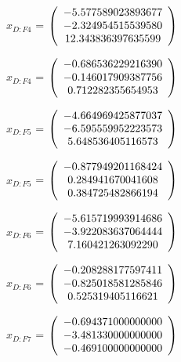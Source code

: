\begin{description}
$x_{D:F4}$  = $\left( \begin{array} {ccc} -5.577589023893677 \\ -2.324954515539580 \\ 12.343836397635599
\end{array} \right)\\ \\$

$\hat{x}_{D:F4}$  = $\left( \begin{array} {ccc} -0.686536229216390 \\ -0.146017909387756 \\ 0.712282355654953
\end{array} \right)\\ \\$

$x_{D:F5}$  = $\left( \begin{array} {ccc} -4.664969425877037 \\ -6.595559952223573 \\ 5.648536405116573
\end{array} \right)\\ \\$

$\hat{x}_{D:F5}$  = $\left( \begin{array} {ccc} -0.877949201168424 \\ 0.284941670041608 \\ 0.384725482866194
\end{array} \right)\\ \\$

$x_{D:F6}$  = $\left( \begin{array} {ccc} -5.615719993914686 \\ -3.922083637064444 \\ 7.160421263092290
\end{array} \right)\\ \\$

$\hat{x}_{D:F6}$  = $\left( \begin{array} {ccc} -0.208288177597411 \\ -0.825018581285846 \\ 0.525319405116621
\end{array} \right)\\ \\$

$x_{D:F7}$  = $\left( \begin{array} {ccc} -0.694371000000000 \\ -3.481330000000000 \\ -0.469100000000000
\end{array} \right)\\ \\$


\end{description}
